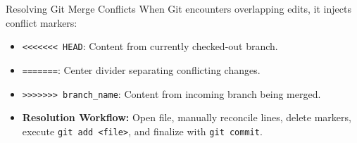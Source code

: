 \begin{cheatbox}{Resolving Git Merge Conflicts}
When Git encounters overlapping edits, it injects conflict markers:
\begin{itemize}[leftmargin=1.5em]
    \item \texttt{<<<<<<< HEAD}: Content from currently checked-out branch.
    \item \texttt{=======}: Center divider separating conflicting changes.
    \item \texttt{>>>>>>> branch\_name}: Content from incoming branch being merged.
    \item \textbf{Resolution Workflow:} Open file, manually reconcile lines, delete markers, execute \texttt{git add <file>}, and finalize with \texttt{git commit}.
\end{itemize}
\end{cheatbox}
